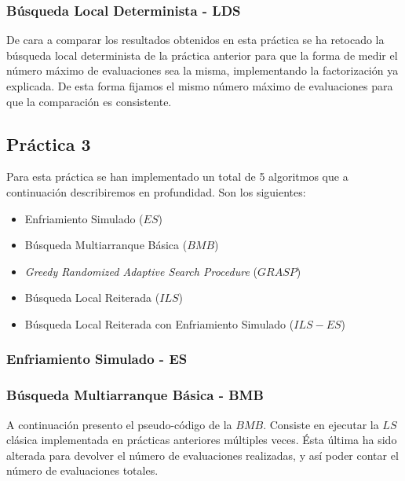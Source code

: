 \documentclass[11pt,a4paper]{article}
\begin{document}
	\subsubsection{ Búsqueda Local Determinista - LDS }
	
	De cara a comparar los resultados obtenidos en esta práctica se ha retocado la búsqueda local determinista de la práctica anterior para que la forma de medir el número máximo de evaluaciones sea la misma, implementando la factorización ya explicada. De esta forma fijamos el mismo número máximo de evaluaciones para que la comparación es consistente. 
	
	\subsection{Práctica 3} \label{sec43}
	
	Para esta práctica se han implementado un total de 5 algoritmos que a continuación describiremos en profundidad. Son los siguientes:
	\begin{itemize}
		\item Enfriamiento Simulado ($ES$)
		\item Búsqueda Multiarranque Básica ($BMB$)
		\item \emph{Greedy Randomized Adaptive Search Procedure} ($GRASP$)
		\item Búsqueda Local Reiterada ($ILS$)
		\item Búsqueda Local Reiterada con Enfriamiento Simulado  ($ILS-ES$)
	\end{itemize}

	
	\subsubsection{ Enfriamiento Simulado - ES }
	
	
	
	\subsubsection{ Búsqueda Multiarranque Básica - BMB }
	
	A continuación presento el pseudo-código de la $BMB$. Consiste en ejecutar la $LS$ clásica implementada en prácticas anteriores múltiples veces. Ésta última ha sido alterada para devolver el número de evaluaciones realizadas, y así poder contar el número de evaluaciones totales. \\
	
\end{document}
